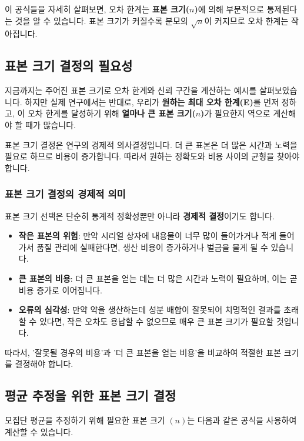 \documentclass[11pt,a4paper]{book}
\theoremstyle{definition}
\begin{document}
\begin{enumerate}
\begin{enumerate}
이 공식들을 자세히 살펴보면, 오차 한계는 \textbf{표본 크기(\(n\))}에 의해 부분적으로 통제된다는 것을 알 수 있습니다. 표본 크기가 커질수록 분모의 \(\sqrt{n}\)이 커지므로 오차 한계는 작아집니다.

\subsection{표본 크기 결정의 필요성}
지금까지는 주어진 표본 크기로 오차 한계와 신뢰 구간을 계산하는 예시를 살펴보았습니다. 하지만 실제 연구에서는 반대로, 우리가 \textbf{원하는 최대 오차 한계(E)}를 먼저 정하고, 이 오차 한계를 달성하기 위해 \textbf{얼마나 큰 표본 크기(\(n\))}가 필요한지 역으로 계산해야 할 때가 많습니다.

\begin{tipbox}
    표본 크기 결정은 연구의 경제적 의사결정입니다. 더 큰 표본은 더 많은 시간과 노력을 필요로 하므로 비용이 증가합니다. 따라서 원하는 정확도와 비용 사이의 균형을 찾아야 합니다.
\end{tipbox}

\subsubsection*{표본 크기 결정의 경제적 의미}
표본 크기 선택은 단순히 통계적 정확성뿐만 아니라 \textbf{경제적 결정}이기도 합니다.
\begin{itemize}
    \item \textbf{작은 표본의 위험}: 만약 시리얼 상자에 내용물이 너무 많이 들어가거나 적게 들어가서 품질 관리에 실패한다면, 생산 비용이 증가하거나 벌금을 물게 될 수 있습니다.
    \item \textbf{큰 표본의 비용}: 더 큰 표본을 얻는 데는 더 많은 시간과 노력이 필요하며, 이는 곧 비용 증가로 이어집니다.
    \item \textbf{오류의 심각성}: 만약 약을 생산하는데 성분 배합이 잘못되어 치명적인 결과를 초래할 수 있다면, 작은 오차도 용납할 수 없으므로 매우 큰 표본 크기가 필요할 것입니다.
\end{itemize}
따라서, '잘못될 경우의 비용'과 '더 큰 표본을 얻는 비용'을 비교하여 적절한 표본 크기를 결정해야 합니다.

\subsection{평균 추정을 위한 표본 크기 결정}
모집단 평균을 추정하기 위해 필요한 표본 크기 \((n)\)는 다음과 같은 공식을 사용하여 계산할 수 있습니다.


\end{enumerate}
\end{enumerate}
\end{document}
